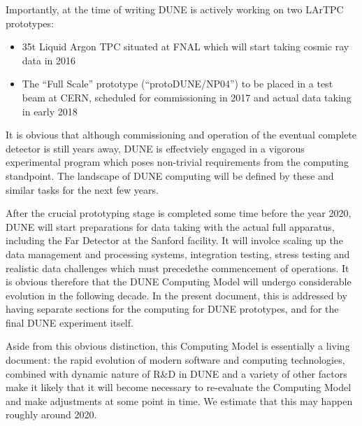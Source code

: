 Importantly, at the time of writing DUNE is actively working on two LArTPC prototypes:
\begin{itemize}
\item 35t Liquid Argon TPC situated at FNAL which will start taking cosmic ray data in 2016
\item The ``Full Scale'' prototype (``protoDUNE/NP04'') to be placed in a test beam at CERN, scheduled for commissioning in 2017 and actual data taking in early 2018
\end{itemize}
\noindent
It is obvious that although commissioning and operation of the eventual complete detector is still years away, DUNE is effectviely engaged
in a vigorous experimental program which poses non-trivial requirements from the computing standpoint. The landscape of DUNE
computing will be defined by these and similar tasks for the next few years.

After the crucial prototyping stage is completed some time before the year 2020, DUNE will start preparations for data taking with the
actual full apparatus, including the Far Detector at the Sanford facility. It will involce scaling up the data management and processing systems,
integration testing,  stress testing and  realistic data challenges which must precedethe commencement of operations.
It is obvious therefore that the DUNE Computing Model will undergo considerable evolution in the following decade. In the present document,
this is addressed  by having separate sections for the computing for DUNE prototypes, and for the final DUNE experiment itself.

Aside from this obvious distinction, this Computing Model is essentially a living document: 
the rapid evolution of modern software and computing technologies, combined with dynamic nature of R\&D in DUNE
and a variety of other factors make it likely that it will become necessary to re-evaluate the Computing Model and make adjustments at
some point in time. We estimate that this may happen roughly around 2020.

